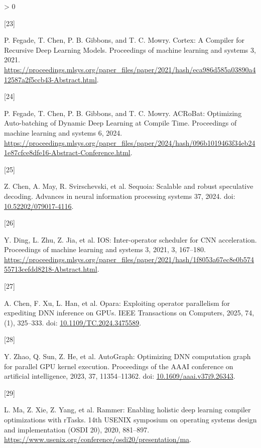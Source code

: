 \documentclass[
  11pt,
  UTF8]{ctexart}
\newlength{\cslhangindent}
\newlength{\csllabelwidth}
\newenvironment{CSLReferences}[2] %
 {%
  \setlength{\parindent}{0pt}
  \ifodd #1 \everypar{\setlength{\hangindent}{\cslhangindent}}\ignorespaces\fi
  \ifnum #2 > 0
  \setlength{\parskip}{#2\baselineskip}
  \fi
 }%
 {}
\newcommand{\CSLLeftMargin}[1]{\parbox[t]{\csllabelwidth}{#1}}
\newcommand{\CSLRightInline}[1]{\parbox[t]{\linewidth - \csllabelwidth}{#1}\break}
\begin{document}
\begin{CSLReferences}{0}{0}
\leavevmode{}%
\CSLLeftMargin{{[}23{]} }
\CSLRightInline{P. Fegade, T. Chen, P. B. Gibbons, and T. C. Mowry.
{Cortex: A Compiler for Recursive Deep Learning Models}. Proceedings of
machine learning and systems 3, 2021.
\url{https://proceedings.mlsys.org/paper_files/paper/2021/hash/eca986d585a03890a412587a2f5ccb43-Abstract.html}.}

\leavevmode{}%
\CSLLeftMargin{{[}24{]} }
\CSLRightInline{P. Fegade, T. Chen, P. B. Gibbons, and T. C. Mowry.
{ACRoBat: Optimizing Auto-batching of Dynamic Deep Learning at Compile
Time}. Proceedings of machine learning and systems 6, 2024.
\url{https://proceedings.mlsys.org/paper_files/paper/2024/hash/096b1019463f34eb241e87cfce8dfe16-Abstract-Conference.html}.}

\leavevmode{}%
\CSLLeftMargin{{[}25{]} }
\CSLRightInline{Z. Chen, A. May, R. Svirschevski, et al. Sequoia:
Scalable and robust speculative decoding. Advances in neural information
processing systems 37, 2024. doi:
\href{https://doi.org/10.52202/079017-4116}{10.52202/079017-4116}.}

\leavevmode{}%
\CSLLeftMargin{{[}26{]} }
\CSLRightInline{Y. Ding, L. Zhu, Z. Jia, et al. IOS: Inter-operator
scheduler for CNN acceleration. Proceedings of machine learning and
systems 3, 2021, 3, 167--180.
\url{https://proceedings.mlsys.org/paper_files/paper/2021/hash/1f8053a67ec8e0b57455713cefdd8218-Abstract.html}.}

\leavevmode{}%
\CSLLeftMargin{{[}27{]} }
\CSLRightInline{A. Chen, F. Xu, L. Han, et al. Opara: Exploiting
operator parallelism for expediting DNN inference on GPUs. IEEE
Transactions on Computers, 2025, 74, (1), 325--333. doi:
\href{https://doi.org/10.1109/TC.2024.3475589}{10.1109/TC.2024.3475589}.}

\leavevmode{}%
\CSLLeftMargin{{[}28{]} }
\CSLRightInline{Y. Zhao, Q. Sun, Z. He, et al. AutoGraph: Optimizing DNN
computation graph for parallel GPU kernel execution. Proceedings of the
AAAI conference on artificial intelligence, 2023, 37, 11354--11362. doi:
\href{https://doi.org/10.1609/aaai.v37i9.26343}{10.1609/aaai.v37i9.26343}.}

\leavevmode{}%
\CSLLeftMargin{{[}29{]} }
\CSLRightInline{L. Ma, Z. Xie, Z. Yang, et al. Rammer: Enabling holistic
deep learning compiler optimizations with rTasks. 14th USENIX symposium
on operating systems design and implementation (OSDI 20), 2020,
881--897.
\url{https://www.usenix.org/conference/osdi20/presentation/ma}.}


\end{CSLReferences}
\end{document}
